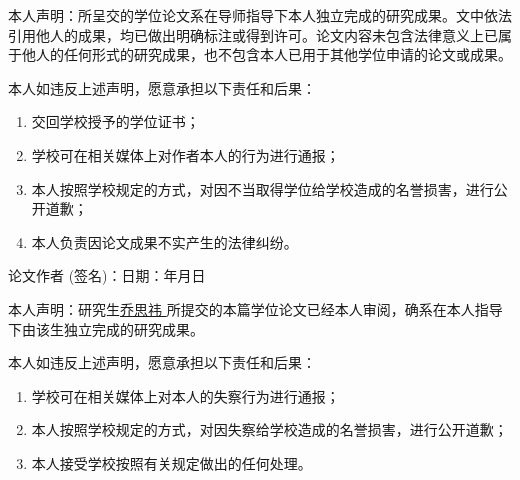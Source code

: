 
\fancyfoot[LE,RO]{}

\begin{center}\xiaowu\end{center}\vspace{-7mm}
\begin{center}\end{center}

本人声明：所呈交的学位论文系在导师指导下本人独立完成的研究成果。文中依法引用他人的成果，均已做出明确标注或得到许可。论文内容未包含法律意义上已属于他人的任何形式的研究成果，也不包含本人已用于其他学位申请的论文或成果。

本人如违反上述声明，愿意承担以下责任和后果：
\begin{enumerate}
	\item 交回学校授予的学位证书；
	\item 学校可在相关媒体上对作者本人的行为进行通报；
	\item 本人按照学校规定的方式，对因不当取得学位给学校造成的名誉损害，进行公开道歉；
	\item 本人负责因论文成果不实产生的法律纠纷。
\end{enumerate}

\vspace{1em}
论文作者 (签名)：\hfill 日期：\hspace{4em}年\hspace{3em}月\hspace{3em}日\hspace{4em}


\vspace{1em}
\begin{center}\end{center}

本人声明：研究生\underline{\quad 乔思祎 \quad}所提交的本篇学位论文已经本人审阅，确系在本人指导下由该生独立完成的研究成果。

本人如违反上述声明，愿意承担以下责任和后果：
\begin{enumerate}
	\item 学校可在相关媒体上对本人的失察行为进行通报；
	\item 本人按照学校规定的方式，对因失察给学校造成的名誉损害，进行公开道歉；
	\item 本人接受学校按照有关规定做出的任何处理。
\end{enumerate}


